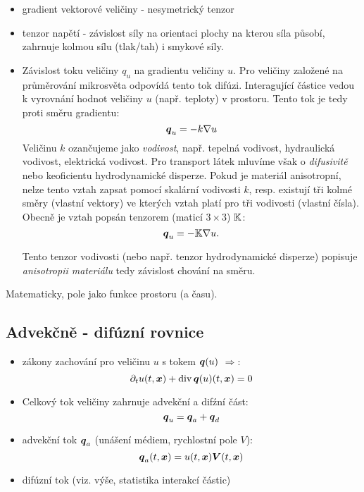 \begin{itemize}
 \begin{itemize}
    \item gradient vektorové veličiny - nesymetrický tenzor
    \item tenzor napětí - závislost síly na orientaci plochy na kterou síla působí, zahrnuje kolmou sílu (tlak/tah) i smykové síly.
    \item Závislost toku veličiny $q_u$ na gradientu veličiny $u$. Pro veličiny založené na průměrování mikrosvěta odpovídá tento tok difúzi. 
          Interagující částice vedou k vyrovnání hodnot veličiny $u$ (např. teploty) v prostoru.
          Tento tok je tedy proti směru gradientu:
          $$
          \mathbf{\boldsymbol{q}}_u = -k \nabla u
          $$
          Veličinu $k$ ozančujeme jako {\it vodivost}, např. tepelná vodivost, 
          hydraulická vodivost, elektrická vodivost. Pro transport látek mluvíme však o {\it difusivitě}
          nebo keoficientu hydrodynamické disperze. Pokud je materiál anisotropní,
          nelze tento vztah zapsat pomocí skalární vodivosti $k$, resp. existují tři kolmé 
          směry (vlastní vektory) ve kterých vztah platí pro tři vodivosti (vlastní čísla).
          Obecně je vztah popsán tenzorem (maticí $3\times 3$) ${\mathbb{K}}$:
          $$
          \mathbf{\boldsymbol{q}}_u = - {\mathbb{K}} \nabla u.
          $$
          
          
          Tento tenzor vodivosti (nebo např. tenzor hydrodynamické disperze) popisuje
          {\it anisotropii materiálu} tedy závislost chování na směru.
  \end{itemize}
\end{itemize}

Matematicky, pole jako funkce prostoru (a času).

\subsection{Advekčně - difúzní rovnice}
 \begin{itemize}
    \item zákony zachování pro veličinu $u$ s tokem $\mathbf{\boldsymbol{q}}(u)$ $\Longrightarrow$:
        $$\partial_t u(t, \mathbf{\boldsymbol{x}}) + \operatorname{div} \mathbf{\boldsymbol{q}}(u)(t, \mathbf{\boldsymbol{x}}) = 0$$
    \item Celkový tok veličiny zahrnuje advekční a difźní část:
    $$
    \mathbf{\boldsymbol{q}}_u = \mathbf{\boldsymbol{q}}_a + \mathbf{\boldsymbol{q}}_d
    $$
    \item advekční tok $\mathbf{\boldsymbol{q}}_a$ (unášení médiem, rychlostní pole $V$):
        $$\mathbf{\boldsymbol{q}}_a(t, \mathbf{\boldsymbol{x}}) = u(t, \mathbf{\boldsymbol{x}}) \mathbf{\boldsymbol{V}}(t, \mathbf{\boldsymbol{x}}) $$
    \item difúzní tok (viz. výše, statistika interakcí částic)
  \end{itemize}

